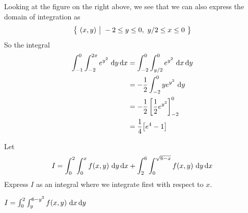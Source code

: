 \begin{solution}
Looking at the figure on the right above, we see that we can also 
express the domain of integration as
\begin{equation*}
\big\{ \ (x,y)\ \big|\ -2\le y\le 0,\ y/2\le x\le 0\ \big\}
\end{equation*} 
So the integral 
\begin{align*}
\int_{-1}^0 \int_{-2}^{2x} e^{y^2}\ \mathrm{d}y\,\mathrm{d}x
&=\int_{-2}^0 \int_{y/2}^{0} e^{y^2}\ \mathrm{d}x\,\mathrm{d}y \\
&=-\frac{1}{2}\int_{-2}^0  y e^{y^2}\ \mathrm{d}y \\
&=-\frac{1}{2}\left[\frac{1}{2}e^{y^2}\right]_{-2}^0 \\
&=\frac{1}{4}\big[e^4-1\big]
\end{align*}
\end{solution}

\begin{question}[M200 2014A] %
Let
\begin{equation*}
I = \int_0^2 \int_0^x f(x,y)\ \dee{y}\,\dee{x}
    + \int_2^6 \int_0^{\sqrt{6-x}} f(x,y)\ \dee{y}\,\dee{x}
\end{equation*}
Express $I$ as an integral where we integrate first with respect to $x$.
\end{question}

%

\begin{answer}
 $I = \int_0^2 \int_y^{6-y^2} f(x,y)\ \dee{x}\,\dee{y}$
\end{answer}

